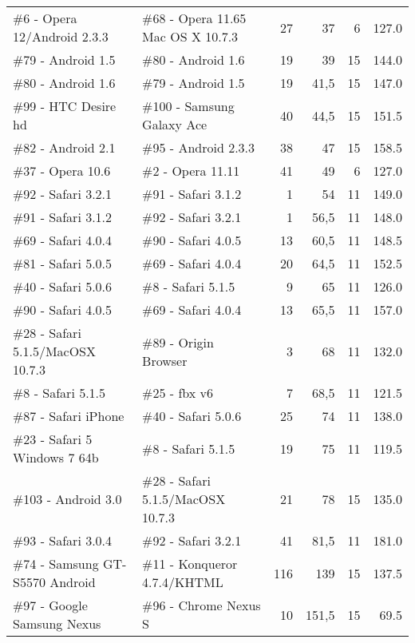 \documentclass[10pt]{IEEEtran}
\begin{document}
\begin{table*}[h]
\begin{tabular}{llrrrr}
    \#6 - Opera 12/Android 2.3.3 & \#68 - Opera 11.65 Mac OS X 10.7.3 & 27    & 37    & 6     & 127.0 \\
    \#79 - Android 1.5 & \#80 - Android 1.6 & 19    & 39    & 15    & 144.0 \\
    \#80 - Android 1.6 & \#79 - Android 1.5 & 19    & 41,5  & 15    & 147.0 \\
    \#99 - HTC Desire hd & \#100 - Samsung Galaxy Ace & 40    & 44,5  & 15    & 151.5 \\
    \#82 - Android 2.1 & \#95 - Android 2.3.3 & 38    & 47    & 15    & 158.5 \\
    \#37 - Opera 10.6 & \#2 - Opera 11.11 & 41    & 49    & 6     & 127.0 \\
    \#92 - Safari 3.2.1 & \#91 - Safari 3.1.2 & 1     & 54    & 11    & 149.0 \\
    \#91 - Safari 3.1.2 & \#92 - Safari 3.2.1 & 1     & 56,5  & 11    & 148.0 \\
    \#69 - Safari 4.0.4 & \#90 - Safari 4.0.5 & 13    & 60,5  & 11    & 148.5 \\
    \#81 - Safari 5.0.5 & \#69 - Safari 4.0.4 & 20    & 64,5  & 11    & 152.5 \\
    \#40 - Safari 5.0.6 & \#8 - Safari 5.1.5 & 9     & 65    & 11    & 126.0 \\
    \#90 - Safari 4.0.5 & \#69 - Safari 4.0.4 & 13    & 65,5  & 11    & 157.0 \\
    \#28 - Safari 5.1.5/MacOSX 10.7.3 & \#89 - Origin Browser & 3     & 68    & 11    & 132.0 \\
    \#8 - Safari 5.1.5 & \#25 - fbx v6 & 7     & 68,5  & 11    & 121.5 \\
    \#87 - Safari iPhone & \#40 - Safari 5.0.6 & 25    & 74    & 11    & 138.0 \\
    \#23 - Safari 5 Windows 7 64b & \#8 - Safari 5.1.5 & 19    & 75    & 11    & 119.5 \\
    \#103 - Android 3.0 & \#28 - Safari 5.1.5/MacOSX 10.7.3 & 21    & 78    & 15    & 135.0 \\
    \#93 - Safari 3.0.4 & \#92 - Safari 3.2.1 & 41    & 81,5  & 11    & 181.0 \\
    \#74 - Samsung GT-S5570 Android & \#11 - Konqueror 4.7.4/KHTML & 116   & 139   & 15    & 137.5 \\
    \#97 - Google Samsung Nexus & \#96 - Chrome Nexus S & 10    & 151,5 & 15    & 69.5 \\
    \hline
    \end{tabular}
  \label{tab:distancetable2}
\end{table*}
\end{document}
